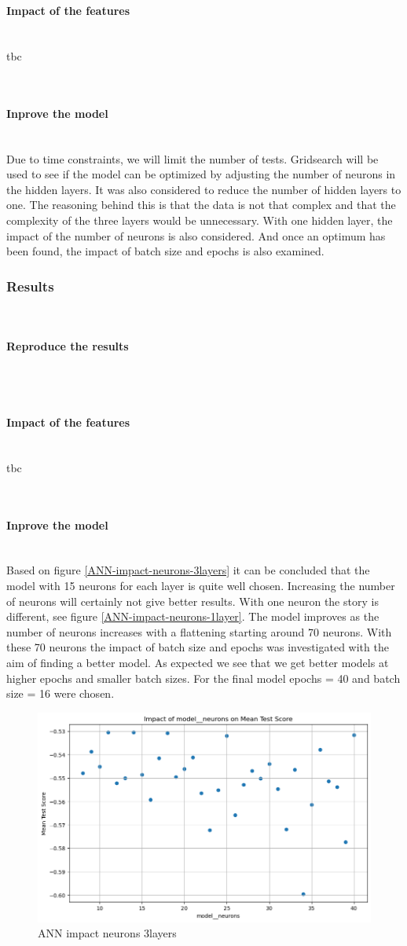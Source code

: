 \documentclass{article}
\newcommand{\subsubsubsection}[1]{%
  \paragraph{#1}\mbox{}\\}
\begin{document}
\subsubsubsection{Impact of the features}
tbc

\subsubsubsection{Inprove the model}
Due to time constraints, we will limit the number of tests. Gridsearch will be used to see if the model can be optimized by adjusting the number of neurons in the hidden layers.
It was also considered to reduce the number of hidden layers to one. The reasoning behind this is that the data is not that complex and that the complexity of the three layers would be unnecessary. With one hidden layer, the impact of the number of neurons is also considered. And once an optimum has been found, the impact of batch size and epochs is also examined.

\subsubsection{Results}

\subsubsubsection{Reproduce the results}


\subsubsubsection{Impact of the features}
tbc

\subsubsubsection{Inprove the model}
Based on figure \ref{ANN-impact-neurons-3layers} it can be concluded that the model with 15 neurons for each layer is quite well chosen. Increasing the number of neurons will certainly not give better results.
With one neuron the story is different, see figure \ref{ANN-impact-neurons-1layer}. The model improves as the number of neurons increases with a flattening starting around 70 neurons. With these 70 neurons the impact of batch size and epochs was investigated with the aim of finding a better model.
As expected we see that we get better models at higher epochs and smaller batch sizes. For the final model epochs = 40 and batch size = 16 were chosen.



\begin{figure}
	\centering
	\includegraphics[width=\linewidth]{figures/ANN_impact_neurons_3layers.png}
	\caption{ANN impact neurons 3layers}
	\label{fig:ANN-impact-neurons-3layers}
\end{figure}
\end{document}
